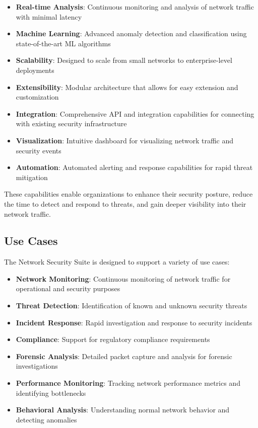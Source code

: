 \begin{itemize}
    \item \textbf{Real-time Analysis}: Continuous monitoring and analysis of network traffic with minimal latency
    \item \textbf{Machine Learning}: Advanced anomaly detection and classification using state-of-the-art ML algorithms
    \item \textbf{Scalability}: Designed to scale from small networks to enterprise-level deployments
    \item \textbf{Extensibility}: Modular architecture that allows for easy extension and customization
    \item \textbf{Integration}: Comprehensive API and integration capabilities for connecting with existing security infrastructure
    \item \textbf{Visualization}: Intuitive dashboard for visualizing network traffic and security events
    \item \textbf{Automation}: Automated alerting and response capabilities for rapid threat mitigation
\end{itemize}

These capabilities enable organizations to enhance their security posture, reduce the time to detect and respond to threats, and gain deeper visibility into their network traffic.

\subsection{Use Cases}
The Network Security Suite is designed to support a variety of use cases:

\begin{itemize}
    \item \textbf{Network Monitoring}: Continuous monitoring of network traffic for operational and security purposes
    \item \textbf{Threat Detection}: Identification of known and unknown security threats
    \item \textbf{Incident Response}: Rapid investigation and response to security incidents
    \item \textbf{Compliance}: Support for regulatory compliance requirements
    \item \textbf{Forensic Analysis}: Detailed packet capture and analysis for forensic investigations
    \item \textbf{Performance Monitoring}: Tracking network performance metrics and identifying bottlenecks
    \item \textbf{Behavioral Analysis}: Understanding normal network behavior and detecting anomalies
\end{itemize}

